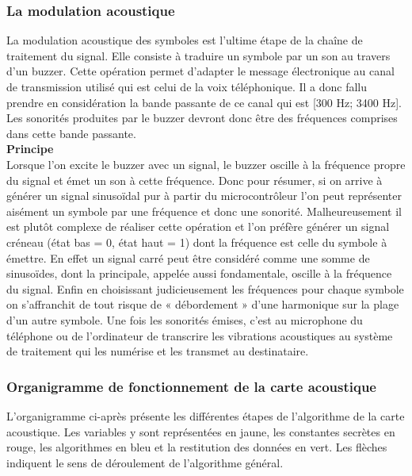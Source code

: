 \subsubsection{La modulation acoustique}
La modulation acoustique des symboles est l’ultime étape de la chaîne de traitement du signal. Elle consiste à traduire un symbole par un son au travers d’un buzzer. Cette opération permet d’adapter le message électronique au canal de transmission utilisé qui est celui de la voix téléphonique. Il a donc fallu prendre en considération la bande passante de ce canal qui est [300 Hz; 3400 Hz]. Les sonorités produites par le buzzer devront donc être des fréquences comprises dans cette bande passante.\\

\textbf{Principe}\\
Lorsque l’on excite le buzzer avec un signal, le buzzer oscille à la fréquence propre du signal et émet un son à cette fréquence. Donc pour résumer, si on arrive à générer un signal sinusoïdal pur à partir du microcontrôleur l’on peut représenter aisément un symbole par une fréquence et donc une sonorité. Malheureusement il est plutôt complexe de réaliser cette opération et l’on préfère générer un signal créneau (état bas = 0, état haut = 1) dont la fréquence est celle du symbole à émettre. En effet un signal carré peut être considéré comme une somme de sinusoïdes, dont la principale, appelée aussi fondamentale, oscille à la fréquence du signal. Enfin en choisissant judicieusement les fréquences pour chaque symbole on s’affranchit de tout risque de « débordement » d’une harmonique sur la plage d’un autre symbole.
Une fois les sonorités émises, c’est au microphone du téléphone ou de l’ordinateur de transcrire les vibrations acoustiques au système de traitement qui les numérise et les transmet au destinataire.

\subsubsection{Organigramme de fonctionnement de la carte acoustique}
L’organigramme ci-après présente les différentes étapes de l’algorithme de la carte acoustique. Les variables y sont représentées en jaune, les constantes secrètes en rouge, les algorithmes en bleu et la restitution des données en vert. Les flèches indiquent le sens de déroulement de l’algorithme général.

